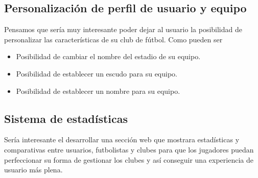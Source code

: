 \subsection{Personalización de perfil de usuario y equipo}
Pensamos que sería muy interesante poder dejar al usuario la posibilidad de
personalizar las características de su club de fútbol. Como pueden ser

\begin{itemize}
\item Posibilidad de cambiar el nombre del estadio de su equipo.
\item Posibilidad de establecer un escudo para su equipo.
\item Posibilidad de establecer un nombre para su equipo.
\end{itemize}

\subsection{Sistema de estadísticas}
Sería interesante el desarrollar una sección web que mostrara estadísticas y
comparativas entre usuarios, futbolistas y clubes para que los jugadores puedan
perfeccionar su forma de gestionar los clubes y así conseguir una experiencia de
usuario más plena.